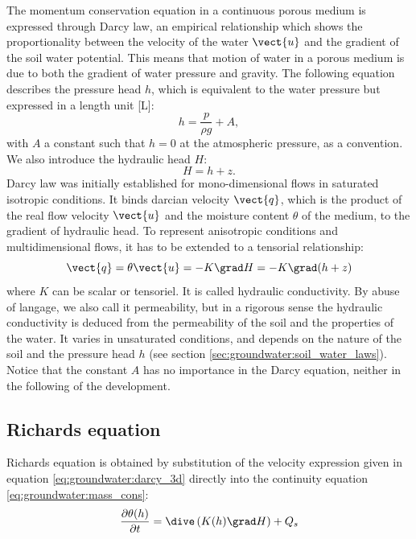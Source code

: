 The momentum conservation equation in a continuous porous medium is expressed through Darcy law,
an empirical relationship which shows the proportionality between the velocity of the water $\vect{u}$ and the gradient of the soil water potential.
This means that motion of water in a porous medium is due to both the gradient of water pressure and gravity.
The following equation describes the pressure head $h$, which is equivalent to the water pressure but expressed in a length unit [L]:
\begin{equation}
\label{eq:groundwater:definition_h}
h=\dfrac{p}{\rho g} + A,
\end{equation}
with $A$ a constant such that $h = 0$ at the atmospheric pressure, as a convention.
We also introduce the hydraulic head $H$:
\begin{equation}
\label{eq:groundwater:definition_h_2}
H = h + z.
\end{equation}
%
Darcy law was initially established for mono-dimensional flows in saturated isotropic conditions.
It binds darcian velocity $\vect{q}$, which is the product of the real flow velocity
$\vect{u}$ and the moisture content $\theta$ of the medium, to the gradient of hydraulic head.
To represent anisotropic conditions and multidimensional flows, it has to be extended to a tensorial relationship:
\begin{equation}
\label{eq:groundwater:darcy_3d}
\vect{q} = \theta \vect{ u} = -K \grad H = -K \grad (h + z)
\end{equation}
where $K$ can be scalar or tensoriel. It is called hydraulic conductivity. By abuse of langage, we also call it permeability, but in a rigorous sense the hydraulic conductivity
is deduced from the permeability of the soil and the properties of the water.
It varies in unsaturated conditions, and depends on the nature of the soil and the pressure head $h$ (see section \ref{sec:groundwater:soil_water_laws}).
Notice that the constant $A$ has no importance in the Darcy equation, neither in the following of the development.

\subsection{Richards equation}

Richards equation is obtained by substitution of the velocity expression given in equation \eqref{eq:groundwater:darcy_3d} directly into
the continuity equation \eqref{eq:groundwater:mass_cons}:
\begin{equation}
\label{eq:groundwater:richards}
\frac{\partial{\theta(h)}}{\partial{t}} = \dive \left( K(h) \grad H \right) + Q_s
\end{equation}

